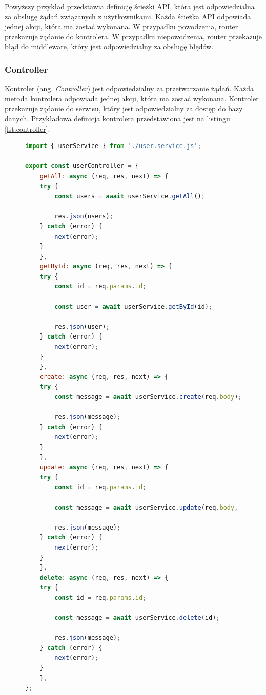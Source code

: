 Powyższy przykład przedstawia definicję ścieżki API, która jest odpowiedzialna za obsługę żądań związanych z użytkownikami. Każda ścieżka API odpowiada jednej akcji, która ma zostać wykonana. W przypadku powodzenia, router przekazuje żądanie do kontrolera. W przypadku niepowodzenia, router przekazuje błąd do middleware, który jest odpowiedzialny za obsługę błędów.

\subsubsection{Controller}
Kontroler (ang. \textit{Controller}) jest odpowiedzialny za przetwarzanie żądań. Każda metoda kontrolera odpowiada jednej akcji, która ma zostać wykonana. Kontroler przekazuje żądanie do serwisu, który jest odpowiedzialny za dostęp do bazy danych. Przykładowa definicja kontrolera przedstawiona jest na listingu \ref{lst:controller}.


\begin{figure}[H]
\begin{lstlisting}[language=JavaScript, caption=Przykładowa definicja kontrolera, label=lst:controller]
import { userService } from './user.service.js';

export const userController = {
    getAll: async (req, res, next) => {
    try {
        const users = await userService.getAll();

        res.json(users);
    } catch (error) {
        next(error);
    }
    },
    getById: async (req, res, next) => {
    try {
        const id = req.params.id;

        const user = await userService.getById(id);

        res.json(user);
    } catch (error) {
        next(error);
    }
    },
    create: async (req, res, next) => {
    try {
        const message = await userService.create(req.body);

        res.json(message);
    } catch (error) {
        next(error);
    }
    },
    update: async (req, res, next) => {
    try {
        const id = req.params.id;

        const message = await userService.update(req.body, id);

        res.json(message);
    } catch (error) {
        next(error);
    }
    },
    delete: async (req, res, next) => {
    try {
        const id = req.params.id;

        const message = await userService.delete(id);

        res.json(message);
    } catch (error) {
        next(error);
    }
    },
};        
\end{lstlisting}
\end{figure}

